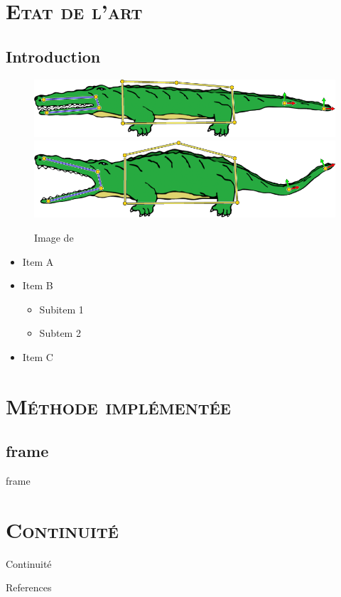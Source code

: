 \documentclass[xcolor=x11names,compress]{beamer}
\renewcommand{\(}{\begin{columns}} \renewcommand{\)}{\end{columns}}
\newcommand{\<}[1]{\begin{column}{#1}} \renewcommand{\>}{\end{column}}
\begin{document}
\section{\scshape Etat de l'art}
\subsection{Introduction}
\begin{frame}{}
  \begin{figure}[h]
    \begin{center}
      \includegraphics[scale=0.2]{alligator-avant.png}
      \includegraphics[scale=0.2]{alligator-apres.png}
    \end{center}
\caption{Image de \citet{JBPS11}}
  \end{figure}
  \begin{itemize}
  \item Item A
  \item Item B
    \begin{itemize}
    \item Subitem 1
    \item Subtem 2
    \end{itemize}
  \item Item C
  \end{itemize}
\end{frame}


\section{\scshape Méthode implémentée}
\subsection{frame}
\begin{frame}{frame}

\end{frame}

\section{\scshape Continuité}
\begin{frame}{Continuité}

\end{frame}

\begin{frame}{References}



\end{frame}
\end{document}
